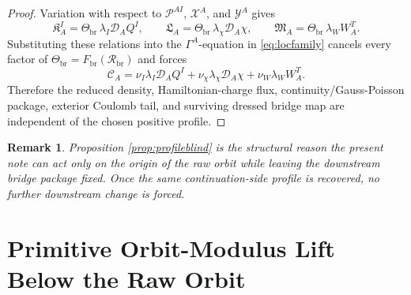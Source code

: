 \documentclass[11pt]{article}
\newcommand{\SpatialD}{\mathcal D}
\newcommand{\ConstCurrent}{\mathcal C}
\newcommand{\ConstGamma}{\Gamma}
\newcommand{\CurvQMult}{\mathscr P}
\newcommand{\CurvChiMult}{\mathscr X}
\newcommand{\CurvTransMult}{\mathscr Y}
\newcommand{\CurvSeed}{\Theta_{\mathrm{br}}}
\newcommand{\CurvProfile}{F_{\mathrm{br}}}
\newcommand{\CurvOneI}{\mathfrak K}
\newcommand{\CurvOneChi}{\mathfrak L}
\newcommand{\CurvOneW}{\mathfrak M}
\newcommand{\BridgeCurv}{\mathcal R_{\mathrm{br}}}
\newtheorem{remark}{Remark}
\begin{document}
\begin{proof}
Variation with respect to \(\CurvQMult^{AI}\), \(\CurvChiMult^A\), and \(\CurvTransMult^A\) gives
\[
\CurvOneI_A^I=\CurvSeed\,\lambda_I\SpatialD_AQ^I,
\qquad
\CurvOneChi_A=\CurvSeed\,\lambda_\chi\SpatialD_A\chi,
\qquad
\CurvOneW_A=\CurvSeed\,\lambda_WW_A^T.
\]
Substituting these relations into the \(\ConstGamma^A\)-equation in \eqref{eq:locfamily} cancels every factor of \(\CurvSeed=\CurvProfile(\BridgeCurv)\) and forces
\[
\ConstCurrent_A
=
\nu_I\lambda_I\SpatialD_AQ^I
+\nu_\chi\lambda_\chi\SpatialD_A\chi
+\nu_W\lambda_WW_A^T.
\]
Therefore the reduced density, Hamiltonian-charge flux, continuity/Gauss-Poisson package, exterior Coulomb tail, and surviving dressed bridge map are independent of the chosen positive profile.
\end{proof}

\begin{remark}
Proposition \ref{prop:profileblind} is the structural reason the present note can act only on the origin of the raw orbit while leaving the downstream bridge package fixed. Once the same continuation-side profile is recovered, no further downstream change is forced.
\end{remark}

\section{Primitive Orbit-Modulus Lift Below the Raw Orbit}
\end{document}
